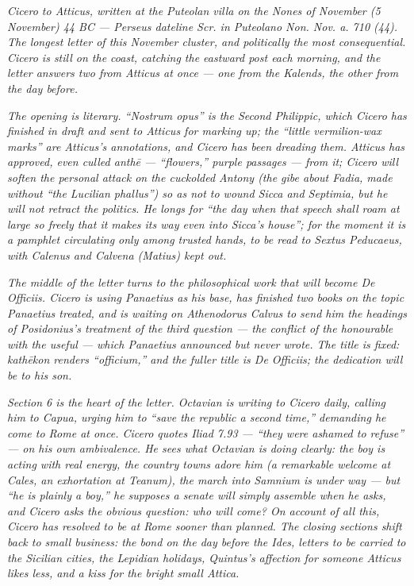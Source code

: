 
\textit{Cicero to Atticus, written at the Puteolan villa on
the Nones of November (5 November) 44 BC --- Perseus
dateline \textit{Scr. in Puteolano Non. Nov. a. 710 (44)}.
The longest letter of this November cluster, and politically
the most consequential. Cicero is still on the coast,
catching the eastward post each morning, and the letter
answers two from Atticus at once --- one from the Kalends,
the other from the day before.}

\textit{The opening is literary. ``Nostrum opus'' is the
Second Philippic, which Cicero has finished in draft and
sent to Atticus for marking up; the ``little vermilion-wax
marks'' are Atticus's annotations, and Cicero has been
dreading them. Atticus has approved, even culled
\textit{anthē} --- ``flowers,'' purple passages --- from it;
Cicero will soften the personal attack on the cuckolded
Antony (the gibe about Fadia, made without ``the Lucilian
phallus'') so as not to wound Sicca and Septimia, but he
will not retract the politics. He longs for ``the day when
that speech shall roam at large so freely that it makes its
way even into Sicca's house''; for the moment it is a
pamphlet circulating only among trusted hands, to be read to
Sextus Peducaeus, with Calenus and Calvena (Matius) kept
out.}

\textit{The middle of the letter turns to the philosophical
work that will become \textit{De Officiis}. Cicero is using
Panaetius as his base, has finished two books on the topic
Panaetius treated, and is waiting on Athenodorus Calvus to
send him the headings of Posidonius's treatment of the third
question --- the conflict of the honourable with the useful
--- which Panaetius announced but never wrote. The title is
fixed: \textit{kathēkon} renders ``officium,'' and the
fuller title is \textit{De Officiis}; the dedication will be
to his son.}

\textit{Section 6 is the heart of the letter. Octavian is
writing to Cicero daily, calling him to Capua, urging him to
``save the republic a second time,'' demanding he come to
Rome at once. Cicero quotes Iliad 7.93 --- ``they were
ashamed to refuse'' --- on his own ambivalence. He sees what
Octavian is doing clearly: the boy is acting with real
energy, the country towns adore him (a remarkable welcome at
Cales, an exhortation at Teanum), the march into Samnium is
under way --- but ``he is plainly a boy,'' he supposes a
senate will simply assemble when he asks, and Cicero asks
the obvious question: who will come? On account of all this,
Cicero has resolved to be at Rome sooner than planned. The
closing sections shift back to small business: the bond on
the day before the Ides, letters to be carried to the
Sicilian cities, the Lepidian holidays, Quintus's affection
for someone Atticus likes less, and a kiss for the bright
small Attica.}
